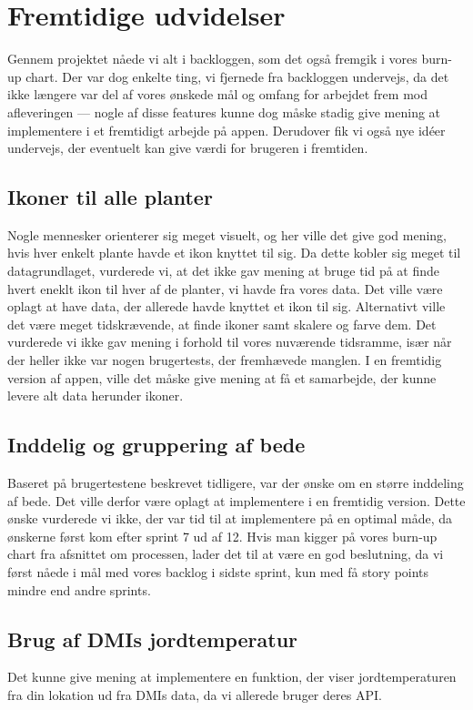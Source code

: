 \section{Fremtidige udvidelser}
Gennem projektet nåede vi alt i backloggen, som det også fremgik i vores burn-up chart. Der var dog enkelte ting, vi fjernede fra backloggen undervejs, da det ikke længere var del af vores ønskede mål og omfang for arbejdet frem mod afleveringen --- nogle af disse features kunne dog måske stadig give mening at implementere i et fremtidigt arbejde på appen. Derudover fik vi også nye idéer undervejs, der eventuelt kan give værdi for brugeren i fremtiden.

\subsection{Ikoner til alle planter}
Nogle mennesker orienterer sig meget visuelt, og her ville det give god mening, hvis hver enkelt plante havde et ikon knyttet til sig. Da dette kobler sig meget til datagrundlaget, vurderede vi, at det ikke gav mening at bruge tid på at finde hvert eneklt ikon til hver af de planter, vi havde fra vores data. Det ville være oplagt at have data, der allerede havde knyttet et ikon til sig. Alternativt ville det være meget tidskrævende, at finde ikoner samt skalere og farve dem. Det vurderede vi ikke gav mening i forhold til vores nuværende tidsramme, især når der heller ikke var nogen brugertests, der fremhævede manglen. I en fremtidig version af appen, ville det måske give mening at få et samarbejde, der kunne levere alt data herunder ikoner. 

\subsection{Inddelig og gruppering af bede}
Baseret på brugertestene beskrevet tidligere, var der ønske om en større inddeling af bede. Det ville derfor være oplagt at implementere i en fremtidig version. Dette ønske vurderede vi ikke, der var tid til at implementere på en optimal måde, da ønskerne først kom efter sprint 7 ud af 12. Hvis man kigger på vores burn-up chart fra afsnittet om processen, lader det til at være en god beslutning, da vi først nåede i mål med vores backlog i sidste sprint, kun med få story points mindre end andre sprints.

\subsection{Brug af DMIs jordtemperatur}
Det kunne give mening at implementere en funktion, der viser jordtemperaturen fra din lokation ud fra DMIs data, da vi allerede bruger deres API.

